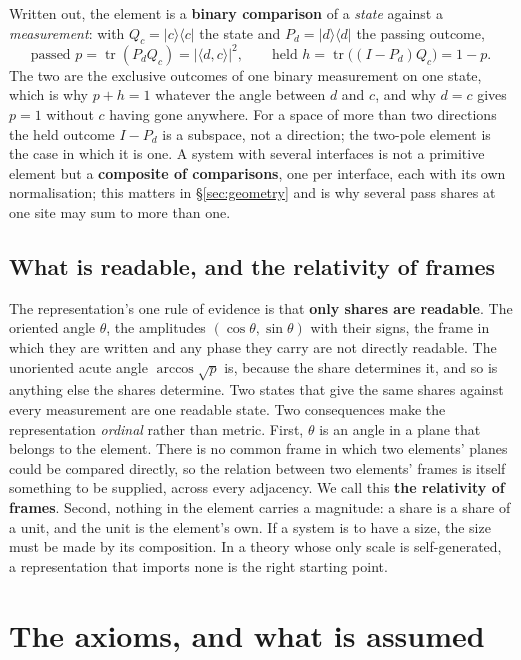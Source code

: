 \documentclass[11pt,a4paper]{article}
\theoremstyle{plain}
\theoremstyle{definition}
\theoremstyle{remark}
\newcommand{\tr}{\operatorname{tr}}
\begin{document}
Written out, the element is a \textbf{binary comparison} of a \emph{state} against a \emph{measurement}: with $Q_c=|c\rangle\langle c|$ the state and $P_d=|d\rangle\langle d|$ the passing outcome,
\begin{equation}
\text{passed } p=\tr(P_dQ_c)=|\langle d,c\rangle|^2,\qquad \text{held } h=\tr\big((I-P_d)Q_c\big)=1-p.
\end{equation}
The two are the exclusive outcomes of one binary measurement on one state, which is why $p+h=1$ whatever the angle between $d$ and $c$, and why $d=c$ gives $p=1$ without $c$ having gone anywhere. For a space of more than two directions the held outcome $I-P_d$ is a subspace, not a direction; the two-pole element is the case in which it is one. A system with several interfaces is not a primitive element but a \textbf{composite of comparisons}, one per interface, each with its own normalisation; this matters in \S\ref{sec:geometry} and is why several pass shares at one site may sum to more than one.

\subsection{What is readable, and the relativity of frames}

The representation's one rule of evidence is that \textbf{only shares are readable}. The oriented angle $\theta$, the amplitudes $(\cos\theta,\sin\theta)$ with their signs, the frame in which they are written and any phase they carry are not directly readable. The unoriented acute angle $\arccos\sqrt p$ is, because the share determines it, and so is anything else the shares determine. Two states that give the same shares against every measurement are one readable state. Two consequences make the representation \emph{ordinal} rather than metric. First, $\theta$ is an angle in a plane that belongs to the element. There is no common frame in which two elements' planes could be compared directly, so the relation between two elements' frames is itself something to be supplied, across every adjacency. We call this \textbf{the relativity of frames}. Second, nothing in the element carries a magnitude: a share is a share of a unit, and the unit is the element's own. If a system is to have a size, the size must be made by its composition. In a theory whose only scale is self-generated, a representation that imports none is the right starting point.

\section{The axioms, and what is assumed}\label{sec:axioms}
\end{document}
